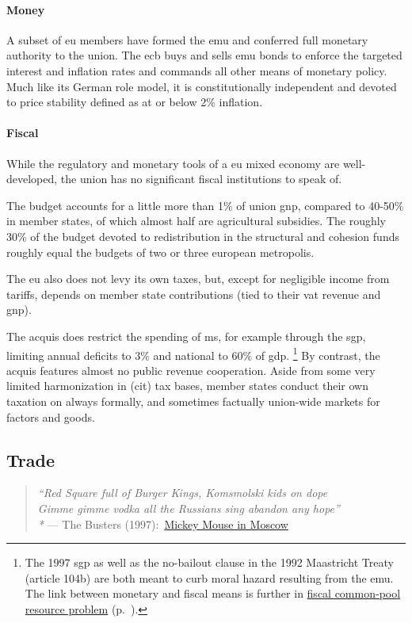 \paragraph{Money} A subset of \gls{eu} members have formed the \gls{emu} and conferred full monetary authority to the union.
The \gls{ecb} buys and sells \gls{emu} bonds to enforce the targeted interest and inflation rates and commands all other means of monetary policy.
Much like its German role model, it is constitutionally independent and devoted to price stability defined as at or below 2\% inflation.

\paragraph{Fiscal} While the regulatory and monetary tools of a \gls{eu} mixed economy are well-developed, the union has no significant fiscal institutions to speak of.


The budget accounts for a little more than 1\% of union \gls{gnp}, compared to 40-50\% in member states, of which almost half are agricultural subsidies.
The roughly 30\% of the budget devoted to redistribution in the structural and cohesion funds roughly equal the budgets of two or three european metropolis.

The \gls{eu} also does not levy its own taxes, but, except for negligible income from tariffs, depends on member state contributions (tied to their \gls{vat} revenue and \gls{gnp}).

The acquis does restrict the spending of \gls{ms}, for example through the \gls{sgp}, limiting annual deficits to 3\% and national to 60\% of \gls{gdp}.
\footnote{
	The 1997 \gls{sgp} as well as the no-bailout clause in the 1992 Maastricht Treaty (article 104b) are both meant to curb moral hazard resulting from the \gls{emu}.
	The link between monetary and fiscal means is further in \hyperref[sec:Fiscal-CPR]{fiscal common-pool resource problem} (p.~\pageref{sec:Fiscal-CPR}).
}
By contrast, the acquis features almost no public revenue cooperation.
Aside from some very limited harmonization in (\gls{cit}) tax bases, member states conduct their own taxation on always formally, and sometimes factually union-wide markets for factors and goods.

\subsection[Trade]{Trade}
\begin{verse}
	\emph{``Red Square full of Burger Kings, Komsmolski kids on dope \\
	Gimme gimme vodka all the Russians sing abandon any hope''\\*}
	--- The Busters (1997):\ \href{http://www.youtube.com/watch?v=xsxRMOnpMTY}{Mickey Mouse in Moscow}\\
\end{verse}

